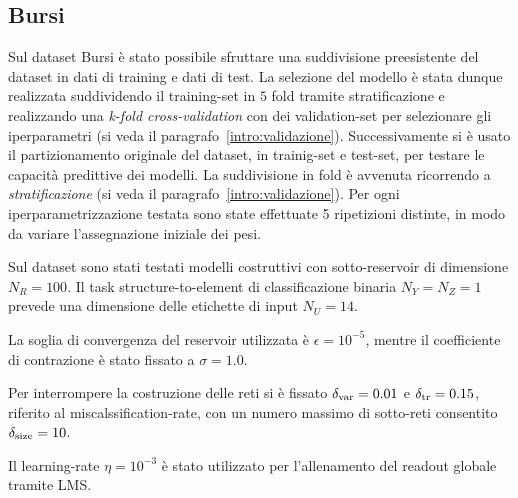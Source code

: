  

\subsection{Bursi}
Sul dataset Bursi è stato possibile sfruttare una suddivisione preesistente del dataset in dati di training e dati di test. La selezione del modello è stata dunque realizzata suddividendo il training-set in $5$ fold tramite stratificazione e realizzando una \emph{k-fold cross-validation} con dei validation-set per selezionare gli iperparametri (si veda il paragrafo~\ref{intro:validazione}). Successivamente si è usato il partizionamento originale del dataset, in trainig-set e test-set, per testare le capacità predittive dei modelli. La suddivisione in fold è avvenuta ricorrendo a \emph{stratificazione} (si veda il paragrafo~\ref{intro:validazione}). Per ogni iperparametrizzazione testata sono state effettuate 5 ripetizioni distinte, in modo da variare l'assegnazione iniziale dei pesi.

Sul dataset sono stati testati modelli costruttivi con sotto-reservoir di dimensione $N_R = 100$. Il task structure-to-element di classificazione binaria $N_Y = N_Z = 1$ prevede una dimensione delle etichette di input $N_U = 14$.

La soglia di convergenza del reservoir utilizzata è $\epsilon = 10^{-5}$, mentre il coefficiente di contrazione è stato fissato a $\sigma = 1.0$.

Per interrompere la costruzione delle reti si è fissato $\delta_\textup{var} = 0.01$ e $\delta_\textup{tr} = 0.15$, riferito al miscalssification-rate, con un numero massimo di sotto-reti consentito $\delta_\textup{size} = 10$.

Il learning-rate $\eta = 10^{-3}$ è stato utilizzato per l'allenamento del readout globale tramite LMS.

